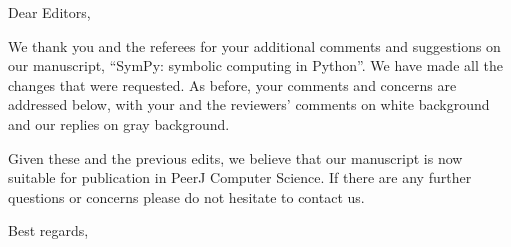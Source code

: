 \documentclass{letter}
\date{November 9, 2016}
\begin{document}
\begin{letter}{}
\opening{Dear Editors,}
We thank you and the referees for your additional comments and suggestions on
our manuscript, ``SymPy: symbolic computing in Python''. We have made all the
changes that were requested. As before, your comments and concerns are
addressed below, with your and the reviewers' comments on white background and
our replies on gray background.

Given these and the previous edits, we believe that our manuscript is now
suitable for publication in PeerJ Computer Science. If there are any further
questions or concerns please do not hesitate to contact us.

\closing{Best regards,\\
 \\
}

\end{letter}
\end{document}
